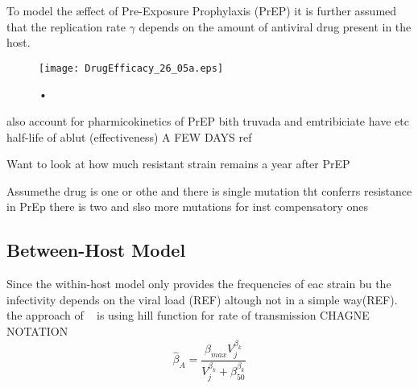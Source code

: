 \documentclass[DIV=15]{scrartcl}
\begin{document}
To model the {\ae}ffect of Pre-Exposure Prophylaxis (PrEP) it is further assumed that the replication rate $\gamma$ depends on the amount of antiviral drug present in the host.

\fi




\begin{figure}[h]
 \begin{center}
 \texttt{[image: DrugEfficacy\_26\_05a.eps]}
 \end{center}
 \caption{•}
 \label{Drug efficacy}
 \end{figure}
 
also account for pharmicokinetics of PrEP bith truvada and emtribiciate have etc half-life of ablut (effectiveness) A  FEW DAYS ref



Want to look  at how much resistant strain remains a year after PrEP


\iffalse
pictures made on  26/05 max values occur at (for strain 1 initial) a=0.01, rL=2 in the active compartment

for the reservoir max occurs at a=1.25e-4 and rL=0.55

now for homeostatic proliferation  the max value in the reservoir is when rho = 0 (just great!) and rL=1.6

in the active compartment it  is rL=1.375 and rho=0.009
\fi


\fi



Assumethe drug is one or othe and there is single mutation tht conferrs resistance in PrEp there is two and slso more mutations for inst compensatory ones

\subsection{Between-Host Model}

Since the within-host model only provides the frequencies of eac  strain bu the infectivity depends on the viral load (REF) altough not in a simple way(REF). the approach of ~\cite{shirreff2011}  is using hill function for rate of transmission 
CHAGNE NOTATION
\begin{equation}
\hat{\beta}_A = \frac{\beta_{max}V_j^{\beta_k}}{V_j^{\beta_k} + \beta_{50}^{\beta_k}}
\end{equation}
\end{document}
